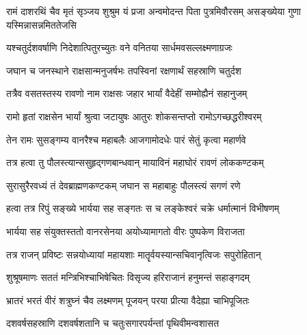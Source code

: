 
\translink{}

\storymeta



\threelineshloka
{रामं दाशरथिं चैव मृतं सृञ्जय शुश्रुम}
{यं प्रजा अन्वमोदन्त पिता पुत्रमिवौरसम्}
{असङ्ख्येया गुणा यस्मिन्नासन्नमिततेजसि}


\twolineshloka
{यश्चतुर्दशवर्षाणि निदेशात्पितुरच्युतः}
{वने वनितया सार्धमवसल्लक्ष्मणाग्रजः}


\twolineshloka
{जघान च जनस्थाने राक्षसान्मनुजर्षभः}
{तपस्विनां रक्षणार्थं सहस्राणि चतुर्दश}


\twolineshloka
{तत्रैव वसतस्तस्य रावणो नाम राक्षसः}
{जहार भार्यां वैदेहीं सम्मोह्यैनं सहानुजम्}


\twolineshloka
{रामो हृतां राक्षसेन भार्यां श्रुत्वा जटायुषः}
{आतुरः शोकसन्तप्तो रामोऽगच्छद्धरीश्वरम्}


\twolineshloka
{तेन रामः सुसङ्गम्य वानरैश्च महाबलैः}
{आजगामोदधेः पारं सेतुं कृत्वा महार्णवे}


\twolineshloka
{तत्र हत्वा तु पौलस्त्यान्ससुहृद्गणबान्धवान्}
{मायाविनं महाघोरं रावणं लोककण्टकम्}


\twolineshloka
{सुरासुरैरवध्यं तं देवब्राह्मणकण्टकम्}
{जघान स महाबाहुः पौलस्त्यं सगणं रणे}


\twolineshloka
{हत्वा तत्र रिपुं सङ्ख्ये भार्यया सह सङ्गतः}
{स च लङ्केश्वरं चक्रे धर्मात्मानं विभीषणम्}


\twolineshloka
{भार्यया सह संयुक्तस्ततो वानरसेनया}
{अयोध्यामागतो वीरः पुष्पकेण विराजता}


\twolineshloka
{तत्र राजन् प्रविष्टः सन्नयोध्यायां महायशाः}
{मातॄर्वयस्यान्सचिवानृत्विजः सपुरोहितान्}


\twolineshloka
{शुश्रूषमाणः सततं मन्त्रिभिश्चाभिषेचितः}
{विसृज्य हरिराजानं हनुमन्तं सहाङ्गदम्}


\twolineshloka
{भ्रातरं भरतं वीरं शत्रुघ्नं चैव लक्ष्मणम्}
{पूजयन् परया प्रीत्या वैदेह्या चाभिपूजितः}


\twolineshloka
{दशवर्षसहस्राणि दशवर्षशतानि च}
{चतुःसगारपर्यन्तां पृथिवीमन्वशासत}


